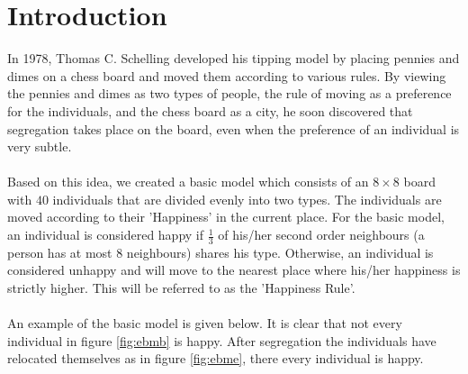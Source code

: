 \section{Introduction}
In 1978, Thomas C. Schelling developed his tipping model by placing pennies and dimes on a chess board and moved them according to various rules. 
By viewing the pennies and dimes as two types of people, the rule of moving as a preference for the individuals, and the chess board as a city, he soon discovered that segregation takes place on the board, even when the preference of an individual is very subtle.\\
\\
Based on this idea, we created a basic model which consists of an $8\times8$ board with $40$ individuals that are divided evenly into two types. 
The individuals are moved according to their 'Happiness' in the current place. 
For the basic model, an individual is considered happy if $\frac{1}{3}$ of his/her second order neighbours (a person has at most $8$ neighbours) shares his type. 
Otherwise, an individual is considered unhappy and will move to the nearest place where  his/her happiness is strictly higher. This will be referred to as the 'Happiness Rule'.\\
\\ 
An example of the basic model is given below. It is clear that not every individual in figure \ref{fig:ebmb} is happy. After segregation the individuals have relocated themselves as in figure \ref{fig:ebme}, there every individual is happy.

